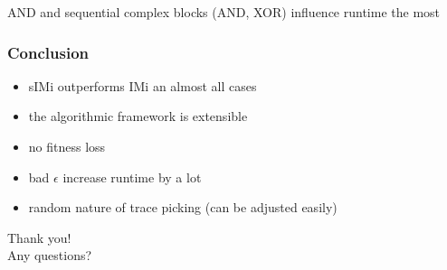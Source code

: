 \documentclass{beamer}
\begin{document}
\begin{frame}
\begin{columns}
\end{columns}
AND and sequential complex blocks (AND, XOR) influence runtime the most
\end{frame}

\begin{frame}
\frametitle{Conclusion}
\begin{itemize}
\item sIMi outperforms IMi an almost all cases
\item the algorithmic framework is extensible
\item no fitness loss
\end{itemize}
\begin{itemize}
\item bad $\epsilon$ increase runtime by a lot
\item random nature of trace picking (can be adjusted easily)
\end{itemize}
\end{frame}

\begin{frame}
\Huge
\centering
Thank you!\\
Any questions?
\end{frame}
\end{document}
